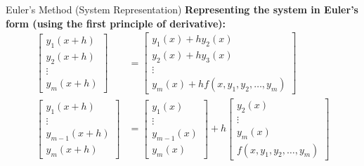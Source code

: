 \documentclass{beamer}
\begin{document}
\begin{frame}{Euler's Method (System Representation)}
\textbf{Representing the system in Euler's form (using the first principle of derivative):}
\begin{align}
    \begin{bmatrix}
        y_1(x + h) \\ 
        y_2(x + h) \\ 
        \vdots \\ 
        y_m(x + h)
    \end{bmatrix}
    &=
    \begin{bmatrix}
        y_1(x) + h y_2(x) \\ 
        y_2(x) + h y_3(x) \\ 
        \vdots \\ 
        y_m(x) + h f(x, y_1, y_2, \dots, y_m)
    \end{bmatrix}\\
    \begin{bmatrix}
        y_1(x+h) \\ 
        \vdots \\ 
        y_{m-1}(x+h) \\ 
        y_m(x+h)
    \end{bmatrix}
    &=
    \begin{bmatrix}
        y_1(x) \\ 
        \vdots \\ 
        y_{m-1}(x) \\ 
        y_m(x)
    \end{bmatrix}
    +
    h
    \begin{bmatrix}
        y_2(x) \\ 
        \vdots \\ 
        y_m(x) \\ 
        f(x, y_1, y_2, \dots, y_m)
    \end{bmatrix}
\end{align}
\end{frame}
\end{document}
